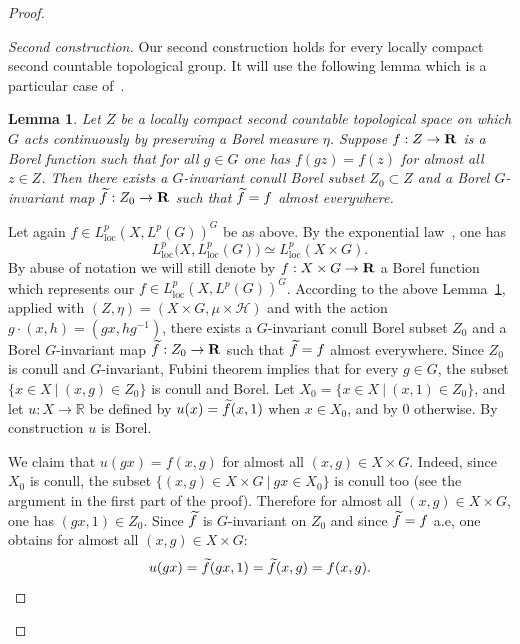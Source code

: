 \documentclass[11pt]{article}
\newtheorem{lemm}[theo]{Lemma}
\theoremstyle{definition}
\numberwithin{equation}{section}
\numberwithin{figure}{section}
\numberwithin{table}{section}
\DeclareMathOperator{\loc}{loc}
\newenvironment{step}[1]{\begin{proof}[#1]}{\let\qed\relax\end{proof}}
\let\oldtilde\tilde
\renewcommand*{\tilde}[1]{\mathchoice{\widetilde{#1}}{\widetilde{#1}}{\oldtilde{#1}}{\oldtilde{#1}}}\let\oldhat\hat
\renewcommand*{\hat}[1]{\mathchoice{\widehat{#1}}{\widehat{#1}}{\oldhat{#1}}{\oldhat{#1}}}
\begin{document}
\begin{proof}
\begin{step}{Second construction}
Our second construction holds for every locally compact second countable topological group. It will use the following lemma which is a particular case of~\cite[Appendices, Proposition~B.5 p.~198]{Z}.

\begin{lemm}\label{lemm4.3}
Let $Z$ be a locally compact second countable topological space on which $G$ acts continuously by preserving a Borel measure $\eta$.
Suppose $f : Z \to \bf R$ is a Borel function such that for all $g \in G$ one has $f(gz) = f(z)$ for almost all $z \in Z$. Then there exists a $G$-invariant conull Borel subset $Z_0 \subset Z$ and a Borel $G$-invariant map $\tilde f : Z_0 \to \bf R$ such that $\tilde f = f$ almost everywhere.
\end{lemm}

Let again $f \in L_{\loc} ^p (X, L^p(G))^G$ be as above. By the exponential law~\cite[Lemma~1.4]{Bl}, one has
\[
L_{\loc} ^p \bigl(X, L_{\loc} ^p(G)\bigr) \simeq L_{\loc} ^p (X \times G).
\]
By abuse of notation we will still denote by $f : X \times G \to \bf R$ a Borel function which represents our $f \in L_{\loc} ^p (X, L^p(G))^G$. According to the above Lemma~\ref{lemm4.3}, applied with $(Z, \eta) = (X \times G, \mu \times \mathcal H)$ and with the action $g \cdot (x,h) = (gx, h g^{-1})$, there exists a $G$-invariant conull Borel subset $Z_0$ and a Borel $G$-invariant map $\tilde f : Z_0 \to \bf R$ such that $\tilde f = f$ almost everywhere. Since $Z_0$ is conull and $G$-invariant, Fubini theorem implies that for every $g \in G$, the subset $\{x \in X~\vert~(x,g) \in Z_0\}$ is conull and Borel. Let $X_0 = \{x \in X~\vert~(x,1) \in Z_0\}$, and let $u : X \to \mathbb R$ be defined by $u(x) = \tilde f(x,1)$ when $x \in X_0$, and by $0$ otherwise. By construction $u$ is Borel.

We claim that $u(gx) = f(x,g)$ for almost all $(x,g) \in X \times G$. Indeed, since $X_0$ is conull, the subset $\{(x,g) \in X \times G~\vert~gx \in X_0 \}$ is conull too (see the argument in the first part of the proof). Therefore for almost all $(x,g) \in X \times G$, one has $(gx, 1) \in Z_0$. Since $\tilde f$ is $G$-invariant on $Z_0$ and since $\tilde f = f$ a.e, one obtains for almost all $(x,g) \in X \times G$:
\[
u(gx) = \tilde f(gx, 1) = \tilde f(x,g) = f(x,g).\qedhere
\]
\end{step}\let\qed\relax
\end{proof}
\end{document}
